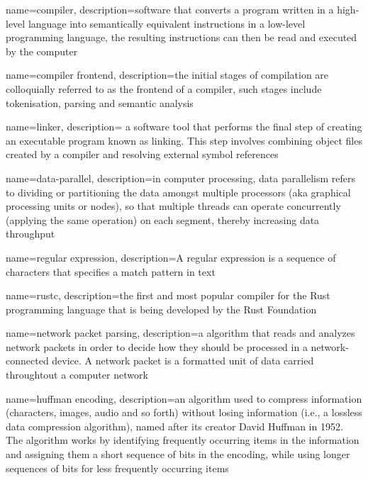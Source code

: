 
\makeglossaries

\renewcommand*{\glstextformat}[1]{\textcolor{black}{%
\mbox{#1}}}

{
    name=compiler,
    description={software that converts a program written in a high-level
language into semantically equivalent instructions in a low-level programming
language, the resulting instructions can then be read and executed by the
computer}
}

{
    name=compiler frontend,
    description={the initial stages of compilation are colloquially referred
to as the frontend of a compiler, such stages include tokenisation, parsing and
semantic analysis}
}

{
    name=linker,
    description={
	a software tool that performs the final step of creating an
executable program known as linking. This step involves combining object files
created by a compiler and resolving external symbol references
	}
}

{
    name=data-parallel,
    description={in computer processing, data parallelism refers to dividing or partitioning the
data amongst multiple processors (aka graphical processing units or nodes), so
that multiple threads can operate concurrently (applying the same operation) on
each segment, thereby increasing data throughput}
}

{
    name=regular expression,
    description={A regular expression is a sequence of characters that specifies
a match pattern in text}
}

{
    name=rustc,
    description={the first and most popular compiler for the Rust programming
language that is being developed by the Rust Foundation}
}

 {
    name=network packet parsing,
    description={a algorithm that reads and analyzes network packets in order
to decide how they should be processed in a network-connected device. A network
packet is a formatted unit of data carried throughtout a computer network}
}

{
    name=huffman encoding,
    description={an algorithm used to compress information (characters,
images, audio and so forth) without losing information (i.e., a lossless data
compression algorithm), named after its creator David Huffman in 1952. The
algorithm works by identifying frequently occurring items in the information
and assigning them a short sequence of bits in the encoding, while using longer
sequences of bits for less frequently occurring items}
}

